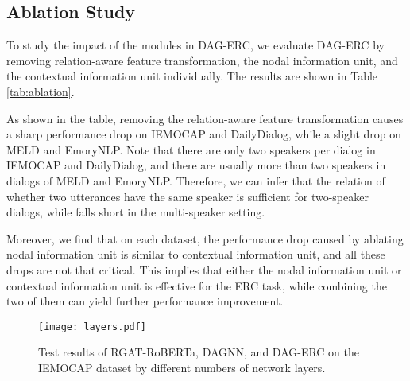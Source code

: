 \documentclass[11pt,a4paper]{article}
\begin{document}
\begin{table}[b]
	\centering
	\caption{Results of ablation study on the four datasets, with \emph{rel-trans}, , and  denoting relation-aware feature transformation, nodal information unit, and contextual information unit, respectively.}
	\label{tab:ablation}
\end{table}

\subsection{Ablation Study}
 To study the impact of the modules in DAG-ERC, we evaluate DAG-ERC by removing relation-aware feature transformation, the nodal information unit, and the contextual information unit individually. 
The results are shown in Table \ref{tab:ablation}. 

As shown in the table, removing the relation-aware feature transformation causes a sharp performance drop on IEMOCAP and DailyDialog, while a slight drop on MELD and EmoryNLP.
Note that there are only two speakers per dialog in IEMOCAP and DailyDialog, and there are usually more than two speakers in dialogs of MELD and EmoryNLP. 
Therefore, we can infer that the relation of whether two utterances have the same speaker is sufficient for two-speaker dialogs, while falls short in the multi-speaker setting.


Moreover, we find that on each dataset, the performance drop caused by ablating nodal information unit is similar to contextual information unit, and all these drops are not that critical.
This implies that either the nodal information unit or contextual information unit is effective for the ERC task, while combining the two of them can yield further performance improvement.

\begin{figure}[t]
	\centering
	\texttt{[image: layers.pdf]} \caption{Test results of RGAT-RoBERTa, DAGNN, and DAG-ERC on the IEMOCAP dataset by different numbers of network layers.}
	\label{fig:Layers}
\end{figure} 
\end{document}
